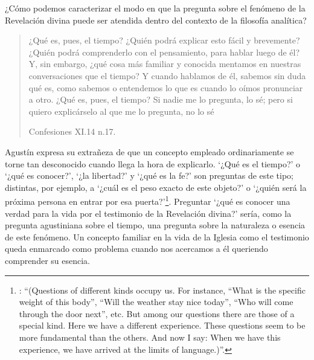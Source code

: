 


¿Cómo podemos caracterizar el modo en que la pregunta sobre el fenómeno de la Revelación divina puede ser atendida dentro del contexto de la filosofía analítica?

\blockquote[Confesiones XI.14 n.17.]{¿Qué es, pues, el tiempo? ¿Quién podrá explicar esto fácil y brevemente? ¿Quién podrá comprenderlo con el pensamiento, para hablar luego de él? Y, sin embargo, ¿qué cosa más familiar y conocida mentamos en nuestras conversaciones que el tiempo? Y cuando hablamos de él, sabemos sin duda qué es, como sabemos o entendemos lo que es cuando lo oímos pronunciar a otro. ¿Qué es, pues, el tiempo? Si nadie me lo pregunta, lo sé; pero si quiero explicárselo al que me lo pregunta, no lo sé}.

Agustín expresa su extrañeza de que un concepto empleado ordinariamente se torne tan desconocido cuando llega la hora de explicarlo. \enquote*{¿Qué es el tiempo?} o \enquote*{¿qué es conocer?}, \enquote*{¿la libertad?} y \enquote*{¿qué es la fe?} son preguntas de este tipo; distintas, por ejemplo, a \enquote*{¿cuál es el peso exacto de este objeto?} o \enquote*{¿quién será la próxima persona en entrar por esa puerta?}\footnote{\Cite[Cf.][304]{wittgenstein2005bt}: \enquote{(Questions of different kinds occupy us. For instance, ``What is the specific weight of this body'', ``Will the weather stay nice today'', ``Who will come through the door next'', etc. But among our questions there are those of a special kind. Here we have a different experience. These questions seem to be more fundamental than the others. And now I say: When we have this experience, we have arrived at the limits of language.)}.}. Preguntar \enquote*{¿qué es conocer una verdad para la vida por el testimonio de la Revelación divina?} sería, como la pregunta agustiniana sobre el tiempo, una pregunta sobre la naturaleza o esencia de este fenómeno. Un concepto familiar en la vida de la Iglesia como el testimonio queda enmarcado como problema cuando nos acercamos a él queriendo comprender su esencia.

